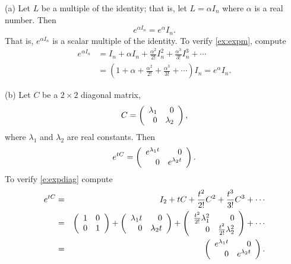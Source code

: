 \documentclass{ximera}
\begin{document}
\noindent (a) \quad Let $L$ be a multiple of the identity; that
is, let $L = \alpha I_n$ where $\alpha$ is a real number.  Then
\begin{equation} \label{ex:expm}
e^{\alpha I_n} = e^{\alpha} I_n.
\end{equation}
That is, $e^{\alpha I_n}$ is a scalar multiple of the
identity.  To verify \eqref{ex:expm}, compute
\begin{align*}
e^{\alpha I_n} &= I_n + \alpha I_n + \frac{\alpha^2}{2!} I_n^2 +
                 \frac{\alpha^3}{3!} I_n^3 +\cdots \\
  &= (1+\alpha+\frac{\alpha^2}{2!}
+\frac{\alpha^3}{3!}+\cdots)I_n = e^{\alpha} I_n.
\end{align*}

\noindent (b) \quad Let $C$ be a $2\times 2$ diagonal matrix,
     \[
          C = \left(\begin{array}{rr} \lambda_1 & 0\\ 0 &\lambda_2\end{array}\right),
     \]
where $\lambda_1$ and $\lambda_2$ are real constants.  Then
\begin{equation}  \label{e:expdiag}
e^{tC} = \left(\begin{array}{rr} e^{\lambda_1 t} & 0\\ 0 &e^{\lambda_2 t}\end{array}\right).
\end{equation}
To verify \eqref{e:expdiag} compute
\begin{eqnarray*}
   e^{tC} & = & I_2 + tC + \frac{t^2}{2!} C^2 +  \frac{t^3}{3!} C^3 +\cdots\\
        & = & \left(\begin{array}{rr} 1 & 0\\ 0 &1\end{array}\right) + \left(\begin{array}{rr} \lambda_1 t & 0\\ 0 &\lambda_2 t\end{array}\right) +
\left(\begin{array}{rr} \frac{t^2}{2!}\lambda_1^2 & 0\\ 0 &\frac{t^2}{2!}\lambda_2^2\end{array}\right) +\cdots\\
        & = & \left(\begin{array}{rr} e^{\lambda_1 t} & 0\\ 0 &e^{\lambda_2 t}\end{array}\right).
\end{eqnarray*}
\end{document}
